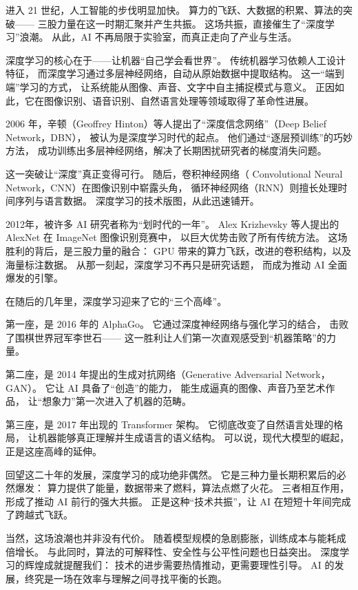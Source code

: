 进入 21 世纪，人工智能的步伐明显加快。  
算力的飞跃、大数据的积累、算法的突破——  
三股力量在这一时期汇聚并产生共振。  
这场共振，直接催生了“深度学习”浪潮。  
从此，AI 不再局限于实验室，而真正走向了产业与生活。  

深度学习的核心在于——让机器“自己学会看世界”。  
传统机器学习依赖人工设计特征，  
而深度学习通过多层神经网络，自动从原始数据中提取结构。  
这一“端到端”学习的方式，  
让系统能从图像、声音、文字中自主捕捉模式与意义。  
正因如此，它在图像识别、语音识别、自然语言处理等领域取得了革命性进展。  

2006 年，辛顿（Geoffrey Hinton）等人提出了“深度信念网络”（Deep Belief Network，DBN），  
被认为是深度学习时代的起点。  
他们通过“逐层预训练”的巧妙方法，  
成功训练出多层神经网络，解决了长期困扰研究者的梯度消失问题。  

这一突破让“深度”真正变得可行。  
随后，卷积神经网络（ Convolutional Neural Network，CNN）在图像识别中崭露头角，  
循环神经网络（RNN）则擅长处理时间序列与语言数据。  
深度学习的技术版图，从此迅速铺开。  

2012年，被许多 AI 研究者称为“划时代的一年”。  
Alex Krizhevsky 等人提出的 AlexNet 在 ImageNet 图像识别竞赛中，  
以巨大优势击败了所有传统方法。  
这场胜利的背后，是三股力量的融合：  
GPU 带来的算力飞跃，改进的卷积结构，以及海量标注数据。  
从那一刻起，深度学习不再只是研究话题，  
而成为推动 AI 全面爆发的引擎。  

在随后的几年里，深度学习迎来了它的“三个高峰”。  

第一座，是  2016 年的 AlphaGo。  
它通过深度神经网络与强化学习的结合，  
击败了围棋世界冠军李世石——  
这一胜利让人们第一次直观感受到“机器策略”的力量。  

第二座，是 2014 年提出的生成对抗网络（Generative Adversarial Network，GAN）。  
它让 AI 具备了“创造”的能力，  
能生成逼真的图像、声音乃至艺术作品，  
让“想象力”第一次进入了机器的范畴。  

第三座，是 2017 年出现的 Transformer 架构。  
它彻底改变了自然语言处理的格局，  
让机器能够真正理解并生成语言的语义结构。  
可以说，现代大模型的崛起，正是这座高峰的延伸。  

回望这二十年的发展，深度学习的成功绝非偶然。  
它是三种力量长期积累后的必然爆发：  
算力提供了能量，数据带来了燃料，算法点燃了火花。  
三者相互作用，形成了推动 AI 前行的强大共振。  
正是这种“技术共振”，让 AI 在短短十年间完成了跨越式飞跃。  

当然，这场浪潮也并非没有代价。  
随着模型规模的急剧膨胀，训练成本与能耗成倍增长。  
与此同时，算法的可解释性、安全性与公平性问题也日益突出。  
深度学习的辉煌成就提醒我们：  
技术的进步需要热情推动，更需要理性引导。  
 AI 的发展，终究是一场在效率与理解之间寻找平衡的长跑。  

